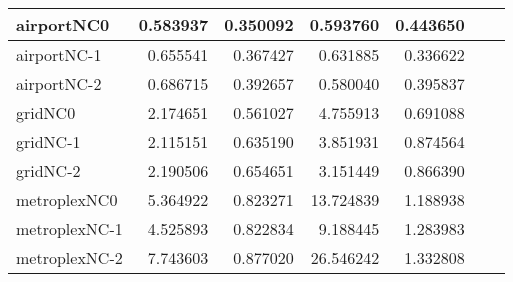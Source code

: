 \begin{longtable}{|l|r|r|r|r|r|r|}
airportNC0 & 0.583937 & 0.350092 & 0.593760 & 0.443650 \\ \hline
airportNC-1 & 0.655541 & 0.367427 & 0.631885 & 0.336622 \\ \hline
airportNC-2 & 0.686715 & 0.392657 & 0.580040 & 0.395837 \\ \hline
gridNC0 & 2.174651 & 0.561027 & 4.755913 & 0.691088 \\ \hline
gridNC-1 & 2.115151 & 0.635190 & 3.851931 & 0.874564 \\ \hline
gridNC-2 & 2.190506 & 0.654651 & 3.151449 & 0.866390 \\ \hline
metroplexNC0 & 5.364922 & 0.823271 & 13.724839 & 1.188938 \\ \hline
metroplexNC-1 & 4.525893 & 0.822834 & 9.188445 & 1.283983 \\ \hline
metroplexNC-2 & 7.743603 & 0.877020 & 26.546242 & 1.332808 \\ \hline
\end{longtable}
